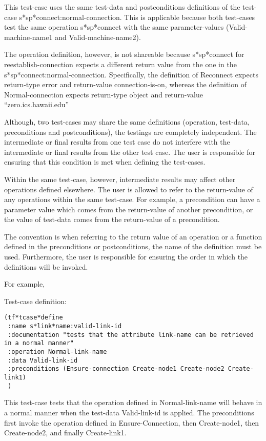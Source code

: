 This test-case uses the same test-data and postconditions definitions
of the test-case s*sp*connect:normal-connection.  
This is applicable because both test-cases test the same operation
s*sp*connect with the same parameter-values (Valid-machine-name1 and
Valid-machine-name2).

The operation definition, however, is not shareable because s*sp*connect
for reestablish-connection expects a different return value  from the one
in the s*sp*connect:normal-connection.  Specifically, the definition of
Reconnect expects return-type error and return-value connection-is-on, 
whereas the definition of Normal-connection expects return-type object
and return-value ``zero.ics.hawaii.edu''

Although, two test-cases may share the same definitions (operation, test-data,
preconditions and postconditions), the testings are completely independent.
The intermediate or final results from one test case do not interfere
with the intermediate or final results from the other test case.
The user is responsible for ensuring that this condition is met
when defining the test-cases.
 
Within the same test-case, however, intermediate results may affect other 
operations defined elsewhere. The user is allowed
to refer to the return-value of any operations within the same test-case.
For example, a precondition can have a parameter value which comes from 
the return-value of another precondition, or the value of test-data comes 
from the return-value of a precondition.  

The convention is when referring to the return value
of an operation or a function defined in the preconditions or 
postconditions, the name of the definition must be used.
Furthermore, the user is responsible for ensuring the order in which
the definitions will be invoked.

\noindent For example,

\noindent Test-case definition:

\small\begin{verbatim}
(tf*tcase*define
 :name s*link*name:valid-link-id
 :documentation "tests that the attribute link-name can be retrieved in a normal manner"
 :operation Normal-link-name
 :data Valid-link-id
 :preconditions (Ensure-connection Create-node1 Create-node2 Create-link1)
 )
\end{verbatim}\normalsize

This test-case tests that the operation defined in Normal-link-name
will behave in a normal manner when the test-data Valid-link-id is applied.
The preconditions first invoke the operation defined in
Ensure-Connection, then Create-node1, then Create-node2, and finally
Create-link1.

